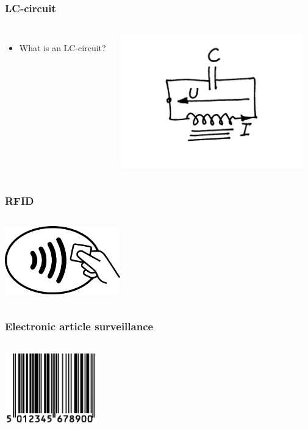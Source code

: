 \documentclass[aspectratio=1610]{beamer}
\begin{document}
\begin{frame}
\frametitle{LC-circuit}
\begin{columns}
\column{37em}
\begin{itemize}
    \item<2-> What is an LC-circuit?
\end{itemize}
\centerline{\hspace*{1cm}\includegraphics[width=8cm]{figs/Stromkrets.png}}


\end{columns}
\end{frame}
\begin{frame}
\frametitle{RFID}
\begin{columns}
\column{37em}
\hspace*{5cm}\includegraphics[width=5cm]{figs/rfid.png}
\end{columns}
\end{frame}
\begin{frame}
\frametitle{Electronic article surveillance}
\begin{columns}
\column{37em}
\hspace*{5cm}\includegraphics[width=4cm]{figs/barcode.png}
\end{columns}
\end{frame}
\end{document}
